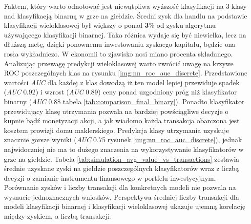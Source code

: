 \documentclass[a4paper, twoside, 11pt, openright]{article}
\begin{document}
Faktem, który warto odnotować jest niewątpliwa wyższość klasyfikacji na 3 klasy nad klasyfikacją binarną w grze na giełdzie. Średni zysk dla handlu na podstawie klasyfikacji wieloklasowej był większy o ponad \textbf{3}\% od zysku algorytmu używającego klasyfikacji binarnej. Taka różnica wydaje się być niewielka, lecz na dłuższą metę, dzięki ponownemu inwestowaniu zyskaego kapitału, będzie ona rosła wykładniczo. W ekonomii to zjawisko nosi miano procenta składanego. Analizując przewagę predykcji wieloklasowej warto zwrócić uwagę na krzywe ROC poszczególnych klas na rysunku  \ref{img:nn_roc_auc_discrete}. Przedstawione wartości \textit{AUC} dla każdej z klas dowodzą iż ten model lepiej przewiduje spadek (\textit{AUC} 0.92) i wzrost (\textit{AUC} 0.89) ceny ponad uzgodniony próg niż klasyfikator binarny (\textit{AUC} 0.88 tabela \ref{tab:comparison_final_binary}). Ponadto klasyfikator przewidujący klasę utrzymania pozwala na bardziej powściągliwe decyzje o kupnie bądź monetyzacji akcji, a jak wiadomo każda transakcja obarczona jest kosztem prowizji domu maklerskiego. Predykcja klasy utrzymania uzyskuje znacznie gorsze wyniki (\textit{AUC} 0.75 rysunek \ref{img:nn_roc_auc_discrete}), jednak najwidoczniej nie ma to dużego znaczenia na wykorzystywanie klasyfikatorów w grze na giełdzie. Tabela \ref{tab:simulation_avg_value_vs_transactions} zestawia średnie uzyskane zyski na giełdzie poszczególnych klasyfikatorów wraz z liczbą decyzji o zamianie instrumentu finansowego w portfelu inwestycyjnym. Porównanie zysków i liczby transakcji dla konkretnych modeli nie pozwala na wysnucie jednoznacznych wniosków. Perspektywa średniej liczby transakcji dla modeli klasyfikacji binarnej i klasyfikacji wieloklasowej ukazuje ujemną korelację między zyskiem, a liczbą transakcji.
\end{document}
